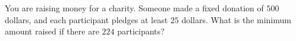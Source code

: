 You are raising money for a charity. Someone made a fixed donation of $500$ dollars, and each participant pledges at least $25$ dollars. What is the minimum amount raised if there are $224$ participants?
